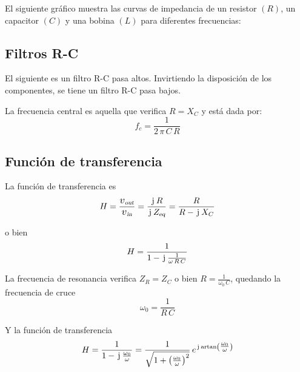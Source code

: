 \documentclass[a5paper,12pt,twoside]{book}
\begin{document}
El siguiente gráfico muestra las curvas de impedancia de un resistor $(R)$, un capacitor $(C)$ y una bobina $(L)$ para diferentes frecuencias:

\begin{center}
    \def\svgwidth{0.7\linewidth}
    
\end{center}


\subsection{Filtros R-C}

El siguiente es un filtro R-C pasa altos. Invirtiendo la disposición de los componentes, se tiene un filtro R-C pasa bajos.

\begin{center}
    \def\svgwidth{0.6\linewidth}
    
\end{center}

La frecuencia central es aquella que verifica $R = X_C$ y está dada por:
\begin{equation*}
    f_c = \frac{1}{2 \, \pi \, C \, R}
\end{equation*}


\subsection{Función de transferencia}

La función de transferencia es
\begin{equation*}
    H = \frac{\sub{\voltage}{out}}{\sub{\voltage}{in}}
    = \frac{\iu \, R}{\iu \, \sub{Z}{eq}}
    = \frac{R}{R - \iu \, X_C}
\end{equation*}

o bien
\begin{equation*}
    H = \frac{1}{1 - \hspace{0.5mm}\mathrm{j}\mkern1mu \, \tfrac{1}{\omega \, R \, C}}
\end{equation*}

La frecuencia de resonancia verifica $Z_R = Z_C$ o bien $R = \frac{1}{\omega_0 \, C}$, quedando la frecuencia de cruce
\begin{equation*}
    \omega_0 = \frac{1}{R \, C}
\end{equation*}

Y la función de transferencia
\begin{equation*}
    H = \frac{1}{1 - \hspace{0.5mm}\mathrm{j}\mkern1mu \, \tfrac{\omega_0}{\omega}} = \frac{1}{\sqrt{1 +  \left(\tfrac{\omega_0}{\omega}\right)^2}} \, e^{\hspace{0.5mm}\mathrm{j}\mkern1mu \operatorname{artan} \left(\tfrac{\omega_0}{\omega}\right)}
\end{equation*}
\end{document}
